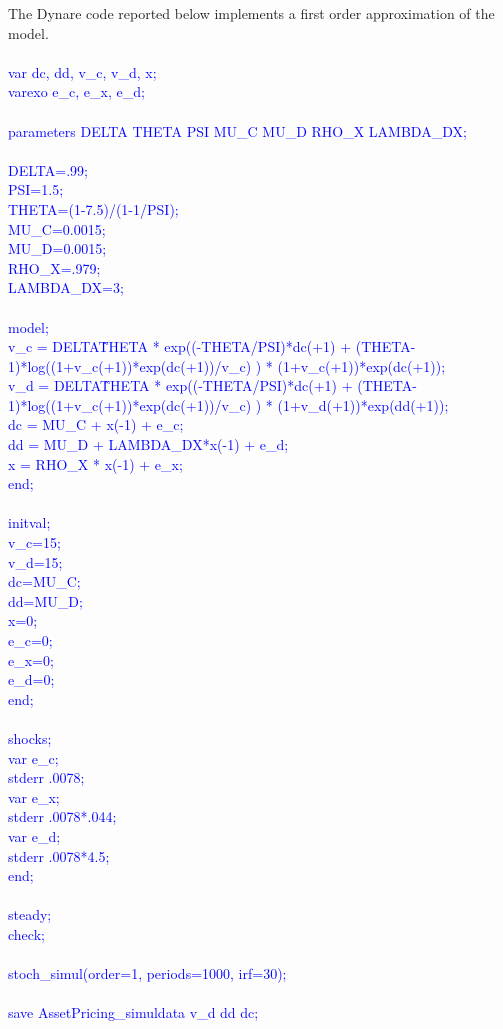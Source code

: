 \documentclass[a4paper,12pt]{scrartcl} %
\begin{document}
The Dynare code reported below implements a first order approximation of the model.\\
\\
\textcolor{blue}{
var  dc, dd, v\_c, v\_d, x;\\
varexo e\_c, e\_x, e\_d;\\
\\
parameters DELTA THETA PSI MU\_C MU\_D RHO\_X LAMBDA\_DX;\\
\\
DELTA=.99;\\
PSI=1.5;\\
THETA=(1-7.5)/(1-1/PSI);\\
MU\_C=0.0015;\\
MU\_D=0.0015;\\
RHO\_X=.979;\\
LAMBDA\_DX=3;\\
\\
model;\\
v\_c       = DELTA\^THETA * exp((-THETA/PSI)*dc(+1) + (THETA-1)*log((1+v\_c(+1))*exp(dc(+1))/v\_c) ) * (1+v\_c(+1))*exp(dc(+1));\\
v\_d       = DELTA\^THETA * exp((-THETA/PSI)*dc(+1) + (THETA-1)*log((1+v\_c(+1))*exp(dc(+1))/v\_c) ) * (1+v\_d(+1))*exp(dd(+1));\\
dc        = MU\_C  + x(-1) + e\_c;\\
dd        = MU\_D + LAMBDA\_DX*x(-1) + e\_d;\\
x         = RHO\_X * x(-1) + e\_x;\\
end;\\
\\
initval;\\
v\_c=15;\\
v\_d=15;\\
dc=MU\_C;\\
dd=MU\_D;\\
x=0;\\
e\_c=0;\\
e\_x=0;\\
e\_d=0;\\
end;\\
\\
shocks;\\
var e\_c;\\
stderr .0078;\\
var e\_x;\\
stderr .0078*.044;\\
var e\_d;\\
stderr .0078*4.5;\\
end;\\
\\
steady;\\
check;\\
\\
stoch\_simul(order=1, periods=1000, irf=30);\\
\\
save AssetPricing\_simuldata v\_d dd dc;}\\
\end{document}
